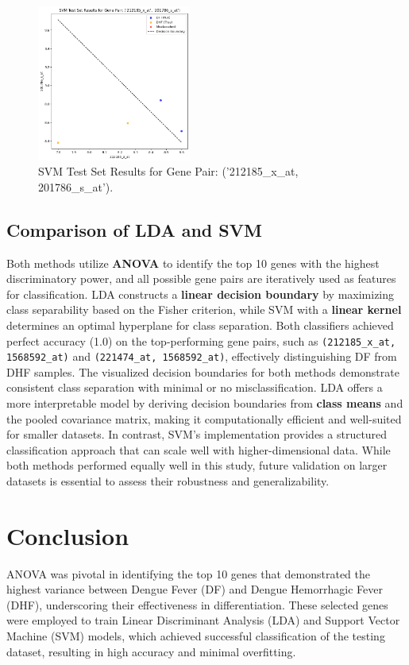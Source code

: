 \documentclass[final]{article}
\begin{document}
        \begin{figure}[H]
            \centering
            \includegraphics[width=0.45\textwidth]{SVM (212185_x_at, 201786_s_at).png}
            \caption{SVM Test Set Results for Gene Pair: ('212185\_x\_at, 201786\_s\_at').}
            \label{fig:lda-test-results}
        \end{figure}

\subsection*{Comparison of LDA and SVM}

Both methods utilize \textbf{ANOVA} to identify the top 10 genes with the highest discriminatory power, and all possible gene pairs are iteratively used as features for classification. LDA constructs a \textbf{linear decision boundary} by maximizing class separability based on the Fisher criterion, while SVM with a \textbf{linear kernel} determines an optimal hyperplane for class separation. Both classifiers achieved perfect accuracy (1.0) on the top-performing gene pairs, such as \texttt{(212185\_x\_at, 1568592\_at)} and \texttt{(221474\_at, 1568592\_at)}, effectively distinguishing DF from DHF samples. The visualized decision boundaries for both methods demonstrate consistent class separation with minimal or no misclassification. LDA offers a more interpretable model by deriving decision boundaries from \textbf{class means} and the pooled covariance matrix, making it computationally efficient and well-suited for smaller datasets. In contrast, SVM's implementation provides a structured classification approach that can scale well with higher-dimensional data. While both methods performed equally well in this study, future validation on larger datasets is essential to assess their robustness and generalizability.


\section*{Conclusion}
ANOVA was pivotal in identifying the top 10 genes that demonstrated the highest variance between Dengue Fever (DF) and Dengue Hemorrhagic Fever (DHF), underscoring their effectiveness in differentiation. These selected genes were employed to train Linear Discriminant Analysis (LDA) and Support Vector Machine (SVM) models, which achieved successful classification of the testing dataset, resulting in high accuracy and minimal overfitting.
\end{document}

